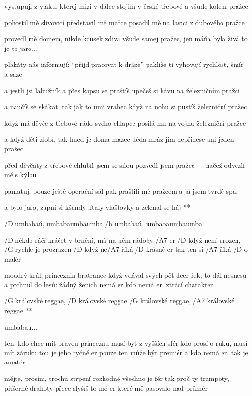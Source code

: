 vystupuji z vlaku, kterej mizí v dálce
stojim v české třebové a všude kolem pražce \s

pohostil mě slivovicí představil mě mařce
posadil mě na lavici z dubového pražce \s

provedl mě domem, nikde kousek zdiva
všude samej pražec, jen máňa byla živá \r to je to jaro...

plakáty nás informují: ``přijď pracovat k dráze''
pakliže ti vyhovují rychlost, šmír a saze \s

a jestli jsi labužník a přes kapsu se praštíš
upečeš si kávu na železničním pražci \s

a naučíš se skákat, tak jak to umí vrabec
když na nohu si pustíš železniční pražec \s

když má děvče z třebové rádo svého chlapce
posílá mu na vojnu železniční pražce \s

a když děti zlobí, tak hned je doma mazec
děda mráz jim nepřinese ani jeden pražec \s

před děvčaty z třebové chlubil jsem se silou
pozvedl jsem pražec --- načež odvezli mě s kýlou \s

pamatuji pouze ještě operační sál
pak praštili mě pražcem a já jsem tvrdě spal

\R a bylo jaro, zapni si kšandy
   lítaly vlaštovky a zelenal se háj **




/D umbabaú, umbabaumbaumba
/h umbabaú, umbabaumbaumba \s

/D někdo ráčí kráčet v brnění, má na něm rádoby /A7 er
/D když není urozen, /G  rychle je prozrazen
/D když ne/A7 říká /D krásné er
tak ten si /A7 říká /D o malér \s

moudrý král, princeznin bratranec
když vdával svých pět dcer
řek, to dál nesnesu a prchnul do lesů:
žádný ženich nemá er
kdo nemá er, ztrácí charakter

\R /G královské reggae, /D královské reggae
   /G královské reggae, /A7 královské reggae **

umbabaú... \s

ten, kdo chce mít pravou princeznu
musí být z vyšších sfér
kdo prosí o ruku, musí mít záruku
tou je jeho ryčné er
pouze ten může být premiér
a kdo nemá er, tak je amatér \s

mějte, prosím, trochu strpení
rozhodně všechno je fér
tak proč ty trampoty, příšerné drahoty
přece slyšíš to mé er
které mě pasovalo nad průměr

